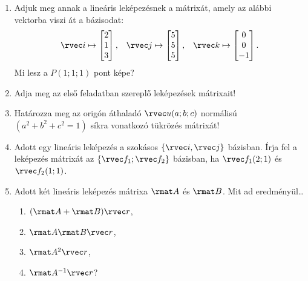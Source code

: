 \documentclass[a4paper, 12pt]{scrartcl}
\begin{document}
\begin{enumerate}
  \item Adjuk meg annak a lineáris leképezésnek a mátrixát, amely az alábbi
        vektorba viszi át a bázisodat:
        $$
          \rvec i \mapsto \begin{bmatrix}
            2 \\ 1 \\ 3
          \end{bmatrix}
          \text, \quad
          \rvec j \mapsto \begin{bmatrix}
            5 \\ 5 \\ 5
          \end{bmatrix}
          \text, \quad
          \rvec k \mapsto \begin{bmatrix}
            0 \\ 0 \\ -1
          \end{bmatrix}
          \text.
        $$
        Mi lesz a $P(1; 1; 1)$ pont képe?

  \item Adja meg az első feladatban szereplő leképezések mátrixait!

  \item Határozza meg az origón áthaladó $\rvec u (a;b;c)$ normálisú
        $(a^2+b^2+c^2 = 1)$ síkra vonatkozó tükrözés mátrixát!

  \item Adott egy lineáris leképezés a szokásos $\{ \rvec i, \rvec j \}$
        bázisban. Írja fel a leképezés mátrixát az $\{ \rvec f_1; \rvec f_2 \}$
        bázisban, ha $\rvec f_1(2; 1)$ és $\rvec f_2(1; 1)$.

  \item Adott két lineáris leképezés mátrixa $\rmat A$ és $\rmat B$.
        Mit ad eredményül\dots
        \begin{multicols}{4}
          \begin{enumerate}
            \item $(\rmat A + \rmat B) \rvec r$,
            \item $\rmat A \rmat B \rvec r$,
            \item $\rmat A^2 \rvec r$,
            \item $\rmat A^{-1} \rvec r$?
          \end{enumerate}
        \end{multicols}


\end{enumerate}
\end{document}
